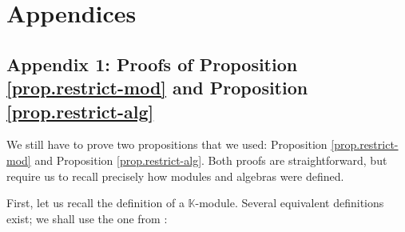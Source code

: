 \documentclass[numbers=enddot,12pt,final,onecolumn,notitlepage]{scrartcl}%
\theoremstyle{definition}
\begin{document}
\section{Appendices}

\subsection{\label{sect.app-restrict}Appendix 1: Proofs of Proposition
\ref{prop.restrict-mod} and Proposition \ref{prop.restrict-alg}}

We still have to prove two propositions that we used: Proposition
\ref{prop.restrict-mod} and Proposition \ref{prop.restrict-alg}. Both proofs
are straightforward, but require us to recall precisely how modules and
algebras were defined.

First, let us recall the definition of a $\mathbb{K}$-module. Several
equivalent definitions exist; we shall use the one from \cite[Definition
6.3.1]{19s}:
\end{document}
